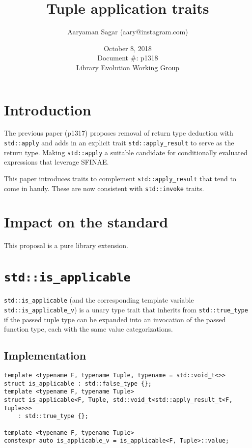 \documentclass{article}
\begin{document}
\title{\textbf{Tuple application traits}}
\author{Aaryaman Sagar (aary@instagram.com)}
\date{October 8, 2018 \\ Document \#: p1318 \\ Library Evolution Working Group}
\maketitle

\section{Introduction}

The previous paper (p1317) proposes removal of return type deduction with
\texttt{std::apply} and adds in an explicit trait \texttt{std::apply\_result}
to serve as the return type.  Making \texttt{std::apply} a suitable candidate
for conditionally evaluated expressions that leverage SFINAE.

This paper introduces traits to complement \texttt{std::apply\_result} that
tend to come in handy.  These are now consistent with \texttt{std::invoke}
traits.

\section{Impact on the standard}
This proposal is a pure library extension.

\section{\texttt{std::is\_applicable}}
\texttt{std::is\_applicable} (and the corresponding template variable
\texttt{std::is\_applicable\_v}) is a unary type trait that inherits from
\texttt{std::true\_type} if the passed tuple type can be expanded into an
invocation of the passed function type, each with the same value
categorizations.

\subsection{Implementation}
\begin{lstlisting}
template <typename F, typename Tuple, typename = std::void_t<>>
struct is_applicable : std::false_type {};
template <typename F, typename Tuple>
struct is_applicable<F, Tuple, std::void_t<std::apply_result_t<F, Tuple>>>
    : std::true_type {};

template <typename F, typename Tuple>
constexpr auto is_applicable_v = is_applicable<F, Tuple>::value;
\end{lstlisting}
\end{document}
